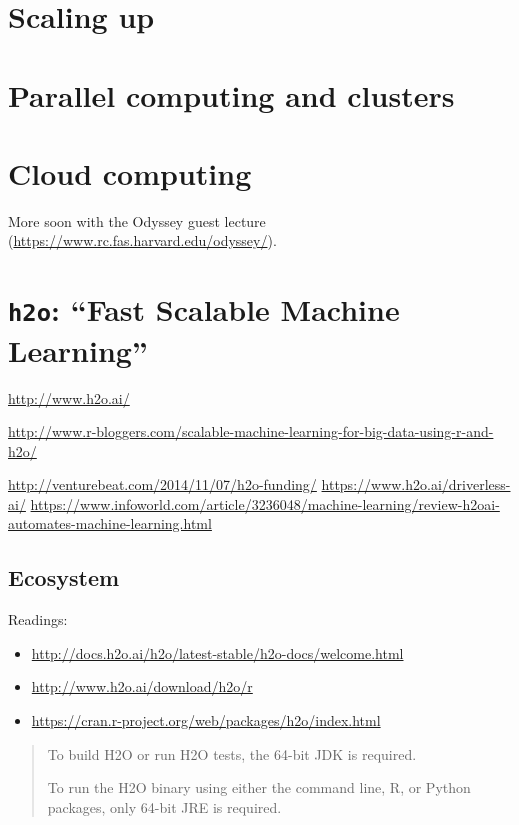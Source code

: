 \documentclass[]{book}
\theoremstyle{definition}
\theoremstyle{definition}
\theoremstyle{definition}
\theoremstyle{remark}
\begin{document}
\section{Scaling up}\label{scaling-up}

\section{Parallel computing and
clusters}\label{parallel-computing-and-clusters}

\section{Cloud computing}\label{cloud-computing}

More soon with the Odyssey guest lecture
(\url{https://www.rc.fas.harvard.edu/odyssey/}).

\section{\texorpdfstring{\texttt{h2o}: ``Fast Scalable Machine
Learning''}{h2o: Fast Scalable Machine Learning}}\label{h2o-fast-scalable-machine-learning}

\url{http://www.h2o.ai/}

\url{http://www.r-bloggers.com/scalable-machine-learning-for-big-data-using-r-and-h2o/}

\url{http://venturebeat.com/2014/11/07/h2o-funding/}
\url{https://www.h2o.ai/driverless-ai/}
\url{https://www.infoworld.com/article/3236048/machine-learning/review-h2oai-automates-machine-learning.html}

\subsection{Ecosystem}\label{ecosystem}

Readings:

\begin{itemize}
\item
  \url{http://docs.h2o.ai/h2o/latest-stable/h2o-docs/welcome.html}
\item
  \url{http://www.h2o.ai/download/h2o/r}
\item
  \url{https://cran.r-project.org/web/packages/h2o/index.html}
\end{itemize}

\begin{quote}
To build H2O or run H2O tests, the 64-bit JDK is required.

To run the H2O binary using either the command line, R, or Python
packages, only 64-bit JRE is required.
\end{quote}
\end{document}
